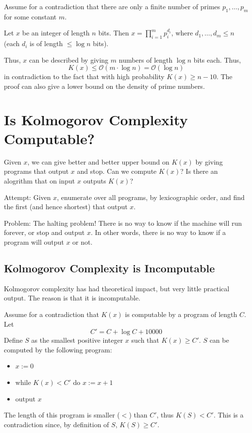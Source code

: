 \documentclass{article}
\begin{document}
Assume for a contradiction that there are only a finite number of primes $p_1,\ldots,p_m$ for some constant $m$.

Let $x$ be an integer of length $n$ bits. Then $x=\prod_{i=1}^{m}p_i^{d_i}$, where $d_1,\ldots,d_m\leq n$ (each $d_i$ is of length $\leq \log n$ bits).

Thus, $x$ can be described by giving $m$ numbers of length $\log n$ bits each. Thus,
\[
K(x)\leq \mathcal{O}(m\cdot \log n) = \mathcal{O}(\log n)
\]
in contradiction to the fact that with high probability $K(x) \geq n-10$. The proof can also give a lower bound on the density of prime numbers.

\section{Is Kolmogorov Complexity Computable?}

Given $x$, we can give better and better upper bound on $K(x)$ by giving programs that output $x$ and stop. Can we compute $K(x)$? Is there an alogrithm that on input $x$ outputs $K(x)$?

Attempt: Given $x$, enumerate over all programs, by lexicographic order, and find the first (and hence shortest) that output $x$.

Problem: The halting problem! There is no way to know if the machine will run forever, or stop and output $x$. In other words, there is no way to know if a program will output $x$ or not. 

\subsection{Kolmogorov Complexity is Incomputable}

Kolmogorov complexity has had theoretical impact, but very little practical output. The reason is that it is incomputable.

Assume for a contradiction that $K(x)$ is computable by a program of length $C$. Let
\[
C' = C + \log C + 10000
\]
Define $S$ as the smallest positive integer $x$ such that $K(x)\geq C'$. $S$ can be computed by the following program:
\begin{itemize}
    \item $x := 0$
    \item while $K(x) < C'$ do $x:=x +1$
    \item output $x$
\end{itemize}
The length of this program is smaller ($<$) than $C'$, thus $K(S) < C'$. This is a contradiction since, by definition of $S$, $K(S)\geq C'$.
\end{document}

